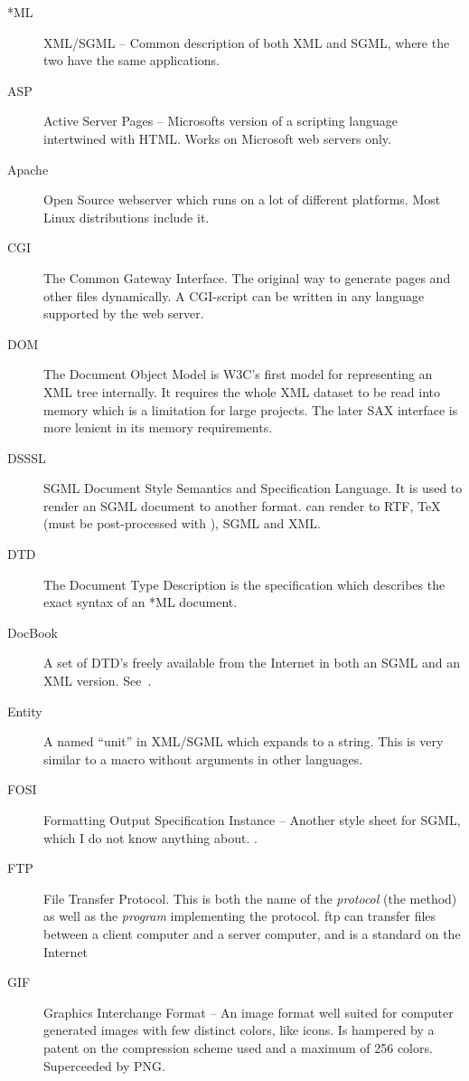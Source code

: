 \begin{description}
  
\item[*ML] XML/SGML -- Common description of both XML and SGML, where the two have the same applications.
\item[ASP] Active Server Pages -- Microsofts version of a scripting language intertwined with HTML. Works on Microsoft web servers only.
\item[Apache] Open Source webserver which runs on a lot of different platforms.  Most Linux distributions include it.
\item[CGI] The Common Gateway Interface.  The original way to generate pages and other files dynamically.  A CGI-script can be written in any language supported by the web server.
\item[DOM] The Document Object Model is W3C's first model for representing an XML tree internally.  It requires the whole XML dataset to be read into memory which is a limitation for large projects.  The later SAX interface is more lenient in its memory requirements.
\item[DSSSL] SGML Document Style Semantics and Specification Language.  It is used to render an SGML document to another format.   can render to RTF, {\TeX} (must be post-processed with ), SGML and XML.
\item[DTD] The Document Type Description is the specification which describes the exact syntax of an *ML document.
\item[DocBook] A set of DTD's freely available from the Internet in both an SGML and an XML version.  See~.
\item[Entity] A named ``unit'' in XML/SGML which expands to a string.  This is very similar to a macro without arguments in other languages.
\item[FOSI] Formatting Output Specification Instance -- Another style sheet for SGML, which I do not know anything about.  .
\item[FTP] File Transfer Protocol.  This is both the name of the \textit{protocol} (the method) as well as the \textit{program} implementing the protocol.  ftp can transfer files between a client computer and a server computer, and is a standard on the Internet
\item[GIF] Graphics Interchange Format  -- An image format well suited for computer generated images with few distinct colors, like icons.  Is hampered by a patent on the compression scheme used and a maximum of 256 colors.  Superceeded by PNG.

\end{description}

